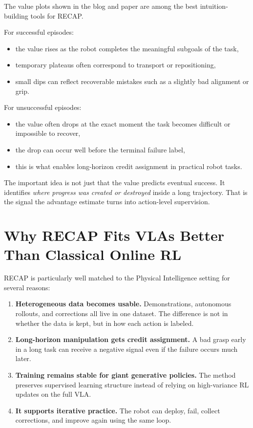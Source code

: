 \documentclass[11pt]{article}
\begin{document}
The value plots shown in the blog and paper are among the best intuition-building tools for RECAP.

For successful episodes:
\begin{itemize}[leftmargin=1.5em]
  \item the value rises as the robot completes the meaningful subgoals of the task,
  \item temporary plateaus often correspond to transport or repositioning,
  \item small dips can reflect recoverable mistakes such as a slightly bad alignment or grip.
\end{itemize}

For unsuccessful episodes:
\begin{itemize}[leftmargin=1.5em]
  \item the value often drops at the exact moment the task becomes difficult or impossible to recover,
  \item the drop can occur well before the terminal failure label,
  \item this is what enables long-horizon credit assignment in practical robot tasks.
\end{itemize}

The important idea is not just that the value predicts eventual success. It identifies \emph{where progress was created or destroyed} inside a long trajectory. That is the signal the advantage estimate turns into action-level supervision.

\section{Why RECAP Fits VLAs Better Than Classical Online RL}

RECAP is particularly well matched to the Physical Intelligence setting for several reasons:
\begin{enumerate}[leftmargin=1.5em]
  \item \textbf{Heterogeneous data becomes usable.} Demonstrations, autonomous rollouts, and corrections all live in one dataset. The difference is not in whether the data is kept, but in how each action is labeled.
  \item \textbf{Long-horizon manipulation gets credit assignment.} A bad grasp early in a long task can receive a negative signal even if the failure occurs much later.
  \item \textbf{Training remains stable for giant generative policies.} The method preserves supervised learning structure instead of relying on high-variance RL updates on the full VLA.
  \item \textbf{It supports iterative practice.} The robot can deploy, fail, collect corrections, and improve again using the same loop.
\end{enumerate}
\end{document}
